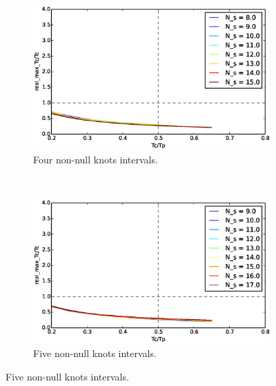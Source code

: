 \begin{figure}
        \centering
        \begin{subfigure}[b]{0.48\textwidth}
                \includegraphics[width=\textwidth]{./img/realtime/Scenario_0__N_knots_4/uni.eps}
                \caption{Four non-null knots intervals.}\label{fig:uni04}
        \end{subfigure}%
        ~ %
        \begin{subfigure}[b]{0.48\textwidth}
                \includegraphics[width=\textwidth]{./img/realtime/Scenario_0__N_knots_5/uni.eps}
                \caption{Five non-null knots intervals.}\label{fig:uni05}
        \end{subfigure}%
        

\end{figure}
